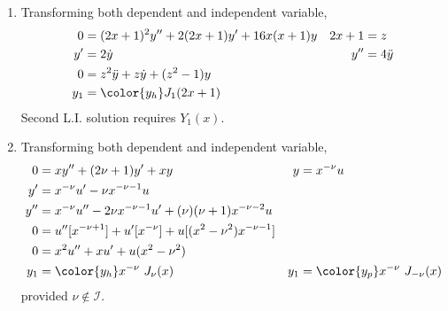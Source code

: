 \begin{enumerate}
    \item Transforming both dependent and independent variable,
          \begin{align}
              0      & = (2x+1)^2y'' + 2(2x+1)y' + 16x(x+1)y  &
              2x + 1 & = z                                      \\
              y'     & = 2 \dot{y}                            &
              y''    & = 4 \ddot{y}                             \\
              0      & = z^2 \ddot{y} + z\dot{y} + (z^2 - 1)y   \\
              y_1    & = \color{y_h} J_{1}(2x+1)
          \end{align}
          Second L.I. solution requires $ Y_1(x) $.

    \item Transforming both dependent and independent variable,
          \begin{align}
              0   & = xy'' + (2\nu + 1)y' + xy                                    &
              y   & = x^{-\nu} u                                                    \\
              y'  & = x^{-\nu} u' - \nu x^{-\nu-1} u                                \\
              y'' & = x^{-\nu} u'' - 2\nu x^{-\nu-1} u' + (\nu)(\nu+1)x^{-\nu-2}u   \\
              0   & = u''[x^{-\nu+1}] + u'[x^{-\nu}] + u[(x^2-\nu^2)x^{-\nu-1}]     \\
              0   & = x^2 u'' + x u' + u(x^2-\nu^2)                                 \\
              y_1 & = \color{y_h}x^{-\nu}\ J_{\nu}(x)                             &
              y_1 & = \color{y_p}x^{-\nu}\ J_{-\nu}(x)
          \end{align}
          provided $ \nu \not\in \mathcal{I}$.


\end{enumerate}
